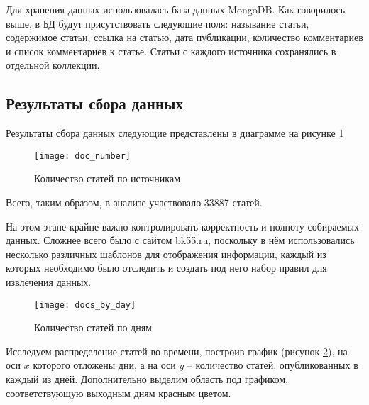 Для хранения данных использовалась база данных MongoDB. Как говорилось выше, в БД будут присутствовать следующие поля: называние статьи, содержимое статьи, ссылка на статью, дата публикации, количество комментариев и список комментариев к статье. Статьи с каждого источника сохранялись в отдельной коллекции.

\subsection{Результаты сбора данных}

Результаты сбора данных следующие представлены в диаграмме на рисунке \ref{fig:doc_number}
\begin{figure}[h!]
	\centering
	\texttt{[image: doc\_number]}
	\caption{Количество статей по источникам}
	\label{fig:doc_number}
\end{figure}

\begin{comment}
\begin{itemize}
\item C сайта gorod55.ru было собрано 6302 статьи
\item Больше всего новостных статей за указанный промежуток времени было опубликовано на bk55.ru -- 14078 статей на bk55.ru
\item Наименьшее количество статей -- 4780 -- было найдено на ngs55.ru
\item 8727 статей по указанным параметрам было собрано с сайта omskinform.ru
\end{itemize}
\end{comment}


Всего, таким образом, в анализе участвовало 33887 статей.

На этом этапе крайне важно контролировать корректность и полноту собираемых данных. Сложнее всего было с сайтом bk55.ru, поскольку в нём использовались несколько различных шаблонов для отображения информации, каждый из которых необходимо было отследить и создать под него набор правил для извлечения данных.

\begin{figure}[h!]
	\centering
	\texttt{[image: docs\_by\_day]}
	\caption{Количество статей по дням}
	\label{fig:docs_by_day}
\end{figure}

Исследуем распределение статей во времени, построив график (рисунок \ref{fig:docs_by_day}), на оси $x$ которого отложены дни, а на оси $y$ -- количество статей, опубликованных в каждый из дней. Дополнительно выделим область под графиком, соответствующую выходным дням красным цветом.


